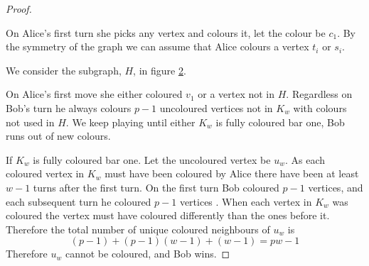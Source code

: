 \begin{proof}
\begin{figure}[H]
    \caption{}
\label{fig:pwlowerbound1}
\end{figure}

On Alice's first turn she picks any vertex and colours it, let the colour be $c_1$. By the symmetry of the graph we can assume that Alice colours a vertex $t_i$ or $s_i$. 

We consider the subgraph, $H$, in figure \ref{fig:pwlowerbound2}. 

\begin{figure}[H]
    \centering
{}
    \caption{}
    \label{fig:pwlowerbound2}
\end{figure}


On Alice's first move she either coloured $v_1$ or a vertex not in $H$. Regardless on Bob's turn he always colours $p-1$ uncoloured vertices not in $K_w$ with colours not used in $H$. We keep playing until either $K_w$ is fully coloured bar one, Bob runs out of new colours.  

If $K_w$ is fully coloured bar one. Let the uncoloured vertex be $u_w$. As each coloured vertex in $K_w$ must have been coloured by Alice there have been at least $w-1$ turns after the first turn. On the first turn Bob coloured $p-1$ vertices, and each subsequent turn he coloured $p-1$ vertices . When each vertex in $K_w$ was coloured the vertex must have coloured differently than the ones before it. Therefore the total number of unique coloured neighbours of $u_w$ is 
\[(p-1)+(p-1)(w-1)+(w-1)=pw-1\]
Therefore $u_w$ cannot be coloured, and Bob wins.


\end{proof}
